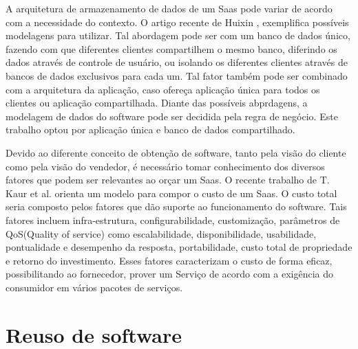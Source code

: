 A arquitetura de armazenamento de dados de um Saas pode variar de acordo com a necessidade do contexto. O artigo recente de Huixin \cite{7586486}, exemplifica possíveis modelagens para utilizar. Tal abordagem pode ser com um banco de dados único, fazendo com que diferentes clientes compartilhem o mesmo banco, diferindo os dados através de controle de usuário, ou isolando os diferentes clientes através de bancos de dados exclusivos para cada um. Tal fator também pode ser combinado com a arquitetura da aplicação, caso ofereça aplicação única para todos os clientes ou aplicação compartilhada. Diante das possíveis abprdagens, a modelagem de dados do software pode ser decidida pela regra de negócio. Este trabalho optou por aplicação única e banco de dados compartilhado.


Devido ao diferente conceito de obtenção de software, tanto pela visão do cliente como pela visão do vendedor, é necessário tomar conhecimento dos diversos fatores que podem ser relevantes ao orçar um Saas. O recente trabalho de T. Kaur et al. \citep{6949281} orienta um modelo para compor o custo de um Saas. O custo total seria composto pelos fatores que dão suporte ao funcionamento do software. Tais fatores incluem infra-estrutura, configurabilidade, customização, parâmetros de QoS(Quality of service) como escalabilidade, disponibilidade, usabilidade, pontualidade e desempenho da resposta, portabilidade, custo total de propriedade e retorno do investimento. Esses fatores caracterizam o custo de forma eficaz, possibilitando ao fornecedor, prover um Serviço de acordo com a exigência do consumidor em vários pacotes de serviços.


\section{Reuso de software}\label{sec:reuso} %


